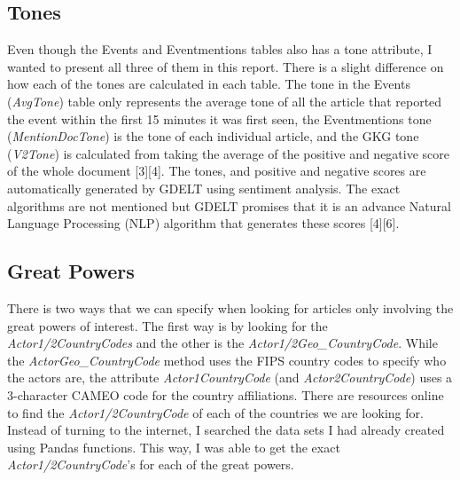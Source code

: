 \documentclass[12pt]{article}
\begin{document}
\subsection*{Tones}

Even though the Events and Eventmentions tables also has a tone attribute, I wanted to present all three of them in this report. There is a slight difference on how each of the tones are calculated in each table. The tone in the Events (\textit{AvgTone}) table only represents the average tone of all the article that reported the event within the first 15 minutes it was first seen, the Eventmentions tone (\textit{MentionDocTone}) is the tone of each individual article, and the GKG tone (\textit{V2Tone}) is calculated from taking the average of the positive and negative score of the whole document [3][4]. The tones, and positive and negative scores are automatically generated by GDELT using sentiment analysis. The exact algorithms are not mentioned but GDELT promises that it is an advance Natural Language Processing (NLP) algorithm that generates these scores [4][6].

\subsection*{Great Powers}

There is two ways that we can specify when looking for articles only involving the great powers of interest. The first way is by looking for the \textit{Actor1/2CountryCodes} and the other is the \textit{Actor1/2Geo\_CountryCode}. While the \textit{ActorGeo\_CountryCode} method uses the FIPS country codes to specify who the actors are, the attribute \textit{Actor1CountryCode} (and \textit{Actor2CountryCode}) uses a 3-character CAMEO code for the country affiliations. There are resources online to find the \textit{Actor1/2CountryCode} of each of the countries we are looking for. Instead of turning to the internet, I searched the data sets I had already created using Pandas functions. This way, I was able to get the exact \textit{Actor1/2CountryCode}'s for each of the great powers. 
    
\end{document}
